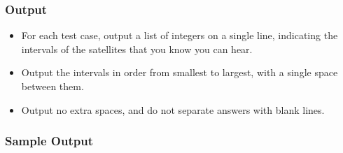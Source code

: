 \subsubsection{Output}
\begin{itemize}
	\item For each test case, output a list of integers on a single line, indicating the intervals of the satellites that you know you can hear.
	\item Output the intervals in order from smallest to largest, with a single space between them.
	\item Output no extra spaces, and do not separate answers with blank lines.
\end{itemize}

\subsubsection{Sample Output}

